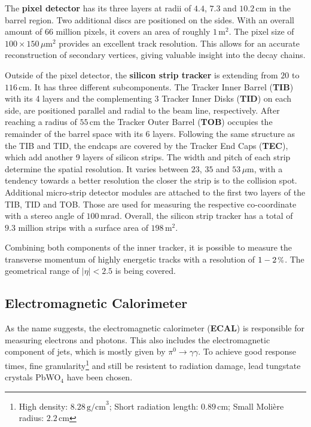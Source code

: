 The \textbf{pixel detector} has its three layers at radii of $4.4$, $7.3$ and $10.2\,\text{cm}$ in the barrel region. Two additional discs are positioned on the sides. With an overall amount of $66$ million pixels, it covers an area of roughly $1\,\text{m}^2$. The pixel size of $100 \times 150\,\mu\text{m}^2$ provides an excellent track resolution. This allows for an accurate reconstruction of secondary vertices, giving valuable insight into the decay chains.

Outside of the pixel detector, the \textbf{silicon strip tracker} is extending from $20$ to $116\,\text{cm}$. It has three different subcomponents. The Tracker Inner Barrel (\textbf{TIB}) with its 4 layers and the complementing 3 Tracker Inner Disks (\textbf{TID}) on each side, are positioned parallel and radial to the beam line, respectively. After reaching a radius of $55\,\text{cm}$ the Tracker Outer Barrel (\textbf{TOB}) occupies the remainder of the barrel space with its 6 layers. Following the same structure as the TIB and TID, the endcaps are covered by the Tracker End Caps (\textbf{TEC}), which add another 9 layers of silicon strips. The width and pitch of each strip determine the spatial resolution. It varies between $23$, $35$ and $53\,\mu\text{m}$, with a tendency towards a better resolution the closer the strip is to the collision spot. Additional micro-strip detector modules are attached to the first two layers of the TIB, TID and TOB. Those are used for measuring the respective co-coordinate with a stereo angle of $100\,\text{mrad}$. Overall, the silicon strip tracker has a total of $9.3$ million strips with a surface area of $198\,\text{m}^2$.

Combining both components of the inner tracker, it is possible to measure the transverse momentum of highly energetic tracks with a resolution of $1-2\,\pct$. The geometrical range of $|\eta| < 2.5$ is being covered.


\subsection{Electromagnetic Calorimeter}

As the name suggests, the electromagnetic calorimeter (\textbf{ECAL}) is responsible for measuring electrons and photons. This also includes the electromagnetic component of jets, which is mostly given by $\pi^0 \rightarrow \gamma \gamma$. To achieve good response times, fine granularity\footnote{High density: $8.28\,\text{g/cm}^3$; Short radiation length: $0.89\,\text{cm}$; Small Moli\`{e}re radius: $2.2\,\text{cm}$} and still be resistent to radiation damage, lead tungstate crystals PbWO$_4$ have been chosen.

